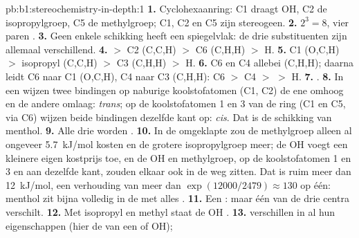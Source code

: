 \begin{solution}{pb:b1:stereochemistry-in-depth:1}
\textbf{1.} Cyclohexaanring: C1 draagt OH, C2 de isopropylgroep, C5 de
methylgroep; C1, C2 en C5 zijn stereogeen.
\textbf{2.} $2^3 = 8$, vier paren .
\textbf{3.} Geen enkele schikking heeft een spiegelvlak: de drie
substituenten zijn allemaal verschillend.
\textbf{4.}  $>$ C2 (C,C,H) $>$ C6 (C,H,H) $>$ H.
\textbf{5.} C1 (O,C,H) $>$ isopropyl (C,C,H) $>$ C3 (C,H,H) $>$ H.
\textbf{6.} C6 en C4 allebei (C,H,H); daarna leidt C6 naar C1 (O,C,H), C4
naar C3 (C,H,H): C6 $>$ C4 $>$  $>$ H.
\textbf{7.} .
\textbf{8.} In een  wijzen twee  bindingen op naburige
koolstofatomen (C1, C2) de ene omhoog en de andere omlaag:
\textit{trans}; op de koolstofatomen 1 en 3 van de ring (C1 en C5, via
C6) wijzen beide  bindingen dezelfde kant op: \textit{cis}.
Dat is de schikking van menthol.
\textbf{9.} Alle drie worden .
\textbf{10.} In de omgeklapte  zou de methylgroep alleen al ongeveer
\qty{5.7}{kJ/mol} kosten en de grotere isopropylgroep meer; de OH voegt
een kleinere eigen kostprijs toe, en de  OH en methylgroep, op de
koolstofatomen 1 en 3 en aan dezelfde kant, zouden elkaar ook in de weg
zitten. Dat is ruim meer dan \qty{12}{kJ/mol}, een verhouding van meer
dan $\exp(12000/2479) \approx 130$ op één: menthol zit bijna volledig in
de  met alles .
\textbf{11.} Een : maar één van de drie centra verschilt.
\textbf{12.} Met isopropyl en methyl  staat de OH .
\textbf{13.}  verschillen in al hun eigenschappen (hier de
 van een  of  OH); 

\end{solution}
